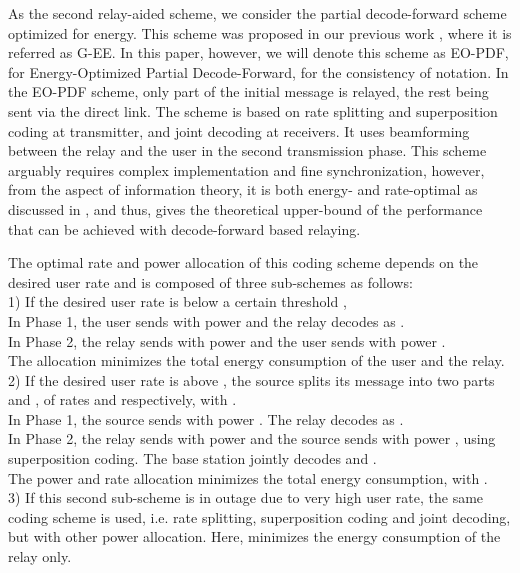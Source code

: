 \documentclass[journal]{IEEEtran}
\theoremstyle{definition}
\begin{document}
As the second relay-aided scheme, we consider the partial decode-forward scheme optimized for energy. This scheme was proposed in our previous work \cite{Journal1}, where it is referred as G-EE. In this paper, however, we will denote this scheme as EO-PDF, for Energy-Optimized Partial Decode-Forward, for the consistency of notation.
In the EO-PDF scheme, only part of the initial message is relayed, the rest being sent via the direct link. The scheme is based on rate splitting and superposition coding at transmitter, and joint decoding at receivers. It uses beamforming between the relay and the user in the second transmission phase. This scheme arguably requires complex implementation and fine synchronization, however, from the aspect of information theory, it is both energy- and rate-optimal as discussed in \cite{Journal1}, and thus, gives the theoretical upper-bound of the performance that can be achieved with decode-forward based relaying.

The optimal rate and power allocation of this coding scheme depends on the desired user rate and is composed of three sub-schemes as follows: \\
1) If the desired user rate is below a certain threshold , \\
\hspace*{15pt} In Phase 1, the user sends  with power  and the relay decodes as . \\
\hspace*{15pt} In Phase 2, the relay sends  with power  and the user sends  with power . \\
The allocation  minimizes the total energy consumption of the user and the relay.
\\
2) If the desired user rate is above , the source splits its message into two parts  and , of rates  and  respectively, with . \\
\hspace*{15pt} In Phase 1, the source sends  with power . The relay decodes as .\\
\hspace*{15pt} In Phase 2, the relay sends  with power  and the source sends  with power , using superposition coding. The base station jointly decodes  and .
\\ The power and rate allocation   minimizes the total energy consumption, with .
\\
3) If this second sub-scheme is in outage due to very high user rate, the same coding scheme is used, i.e. rate splitting, superposition coding and joint decoding, but with other power allocation. Here,  minimizes the energy consumption of the relay only.
\end{document}
